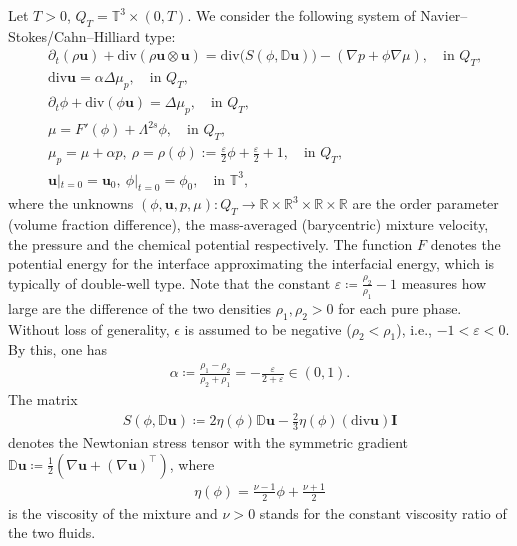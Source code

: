 \documentclass[reqno,a4paper,11pt]{amsart}
\theoremstyle{plain}
\numberwithin{equation}{section}
\newcommand{\bb}[1]{\mathbb{#1}}
\newcommand{\bbt}{\bb{T}}
\begin{document}
	Let $T > 0$, $Q_T = \bbt^3 \times (0,T)$. We consider the following system of Navier--Stokes/Cahn--Hilliard type:
	\begin{subequations}
		\label{model2}
		\begin{align}
			\label{model2-1}
			& \partial_t(\rho  \mathbf{u}) + \mathrm{div}\left (\rho  \mathbf{u}\otimes
			\mathbf{u}\right)=  \mathrm{div}\big(S(\phi,\mathbb{ D}\mathbf{u})\big)-(\nabla p
			+\phi \nabla \mu), \quad\text{in $Q_{T}$},\\
			\label{model2-2}
			&\mathrm{div}  \mathbf{u} = \alpha \Delta\mu_p, \quad\text{in $Q_{T}$},\\
			\label{model2-3}
			&\partial_t\phi + \mathrm{div}(\phi  \mathbf{u})=\Delta\mu_p, \quad\text{in $Q_{T}$},\\
			\label{model2-4}
			& \mu=F'(\phi)+\Lambda^{2s} \phi, \quad\text{in $Q_{T}$},\\
			\label{model2-5}
			&\mu_p=\mu+\alpha p, \  \rho=\rho(\phi):=\frac{\varepsilon}{2}\phi+\frac{\varepsilon}{2}+1, \quad\text{in $Q_{T}$},\\
			\label{model2-5-0}&\mathbf{u}|_{t=0}=\mathbf{u}_{0},\ \phi|_{t=0}=\phi_{0}, \quad\text{in $\bbt^3$},
		\end{align}
	\end{subequations}
	where the unknowns $(\phi,\mathbf{u},p,\mu): Q_T \to \mathbb{R} \times \mathbb{R}^3 \times \mathbb{R} \times \mathbb{R}$ are the order parameter (volume fraction difference), the mass-averaged (barycentric) mixture velocity, the pressure and the chemical potential respectively. The function $F$ denotes the potential energy for the interface approximating the interfacial energy, which is typically of double-well type. 
	Note that the constant $\varepsilon\coloneqq \frac{\rho_2}{\rho_1} - 1 $ measures how large are the difference of the two densities $ \rho_1, \rho_2 > 0 $ for each pure phase. Without loss of generality, $\epsilon$ is assumed to be negative ($\rho_2 < \rho_1$), i.e., $-1 <\varepsilon < 0$. By this, one has
	\begin{align*}
		\alpha\coloneqq \frac{\rho_1 - \rho_2}{\rho_2 + \rho_1} = - \frac{\varepsilon}{2+\varepsilon} \in (0,1).
	\end{align*}
	\fi
	The matrix
	\begin{align*}
		S(\phi,\mathbb{ D}\mathbf{u})\coloneqq2\eta(\phi) \mathbb{ D}\mathbf{u}-\frac{2}{3}\eta(\phi) (\mathrm{div}  \mathbf{u}) \mathbf{I}
	\end{align*}
	denotes the Newtonian stress tensor with the symmetric gradient $\mathbb{D}\mathbf{u} \coloneqq \frac12(\nabla  \mathbf{u}+(\nabla \mathbf{u})^\top)$, where
	\begin{align*}
		\eta(\phi)=\frac{\nu-1}{2}\phi+\frac{\nu+1}{2}
	\end{align*}
	is the viscosity of the mixture and
	$\nu>0$ stands for the constant viscosity ratio of the two fluids.
	
\end{document}
